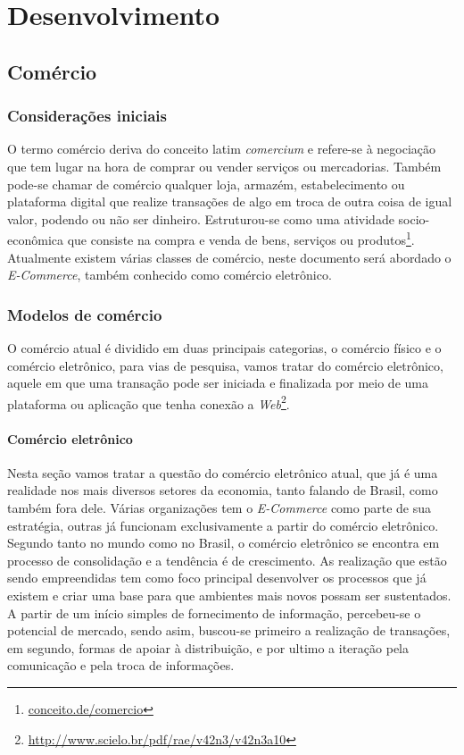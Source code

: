 \part{Desenvolvimento}

\chapter[Comércio]{Comércio}
\section{Considerações iniciais}

O termo comércio deriva do conceito latim \textit{comercium} e refere-se à negociação que tem lugar na hora de comprar ou vender serviços ou mercadorias. Também pode-se chamar de comércio qualquer loja, armazém, estabelecimento ou plataforma digital que realize transações de algo em troca de outra coisa de igual valor, podendo ou não ser dinheiro. Estruturou-se como uma atividade socio-econômica que consiste na compra e venda de bens, serviços ou produtos\footnote{\url{conceito.de/comercio}}. Atualmente existem várias classes de comércio, neste documento será abordado o \textit{E-Commerce}, também conhecido como comércio eletrônico.

\section{Modelos de comércio}

O comércio atual é dividido em duas principais categorias, o comércio físico e o comércio eletrônico, para vias de pesquisa, vamos tratar do comércio eletrônico, aquele em que uma transação pode ser iniciada e finalizada por meio de uma plataforma ou aplicação que tenha conexão a \textit{Web}\footnote{\url{http://www.scielo.br/pdf/rae/v42n3/v42n3a10}}.

\subsection{Comércio eletrônico}

Nesta seção vamos tratar a questão do comércio eletrônico atual, que já é uma realidade nos mais diversos setores da economia, tanto falando de Brasil, como também fora dele. Várias organizações tem o \textit{E-Commerce} como parte de sua estratégia, outras já funcionam exclusivamente a partir do comércio eletrônico. Segundo \cite{rae:2002} tanto no mundo como no Brasil, o comércio eletrônico se encontra em processo de consolidação e a tendência é de crescimento. As realização que estão sendo empreendidas tem como foco principal desenvolver os processos que já existem e criar uma base para que ambientes mais novos possam ser sustentados. A partir de um início simples de fornecimento de informação, percebeu-se o potencial de mercado, sendo asim, buscou-se primeiro a realização de transações, em segundo, formas de apoiar à distribuição, e por ultimo a iteração pela comunicação e pela troca de informações\cite{rae:2002}.

